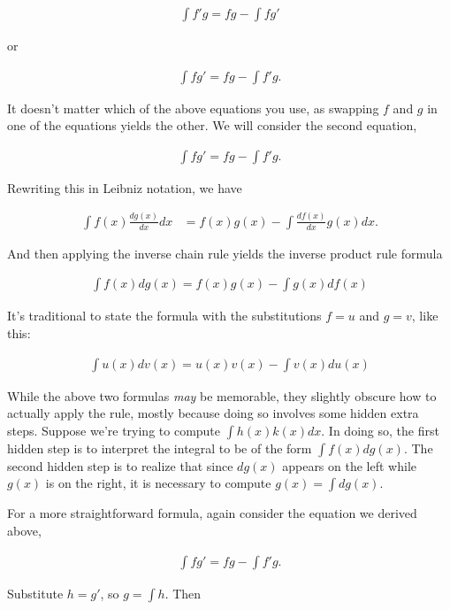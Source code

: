 \begin{align*}
	\int f'g = fg - \int fg'
\end{align*}
   
or
    
\begin{align*}
	\int fg' = fg - \int f'g.
\end{align*}
    
It doesn't matter which of the above equations you use, as swapping $f$ and $g$ in one of the equations yields the other. We will consider the second equation,
    
\begin{align*}
    \int fg' = fg - \int f'g.
\end{align*}
    
Rewriting this in Leibniz notation, we have

\begin{align*}
	\int f(x) \frac{dg(x)}{dx} dx &= f(x) g(x) - \int \frac{df(x)}{dx} g(x) dx.
\end{align*}

And then applying the inverse chain rule yields the inverse product rule formula

\begin{align*}
	\boxed
	{
		\int f(x) dg(x) = f(x) g(x) - \int g(x) df(x)
	}
\end{align*}

It's traditional to state the formula with the substitutions $f = u$ and $g = v$, like this:

\begin{align*}
	\boxed
	{
		\int u(x) dv(x) = u(x) v(x) - \int v(x) du(x)
	}
\end{align*}

While the above two formulas \textit{may} be memorable, they slightly obscure how to actually apply the rule, mostly because doing so involves some hidden extra steps. Suppose we're trying to compute $\int h(x) k(x) dx$. In doing so, the first hidden step is to interpret the integral to be of the form $\int f(x) dg(x)$. The second hidden step is to realize that since $dg(x)$ appears on the left while $g(x)$ is on the right, it is necessary to compute $g(x) = \int dg(x)$.

For a more straightforward formula, again consider the equation we derived above,

\begin{align*}
	\int fg' = fg - \int f'g.
\end{align*}

Substitute $h = g'$, so $g = \int h$. Then

